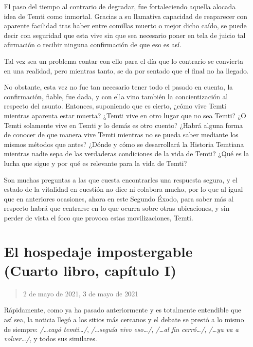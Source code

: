 \documentclass[
  spanish,
]{book}
\begin{document}
El paso del tiempo al contrario de degradar, fue fortaleciendo aquella alocada idea de Temti como inmortal. Gracias a su llamativa capacidad de reaparecer con aparente facilidad tras haber entre comillas muerto o mejor dicho caído, se puede decir con seguridad que esta vive sin que sea necesario poner en tela de juicio tal afirmación o recibir ninguna confirmación de que eso es así.

Tal vez sea un problema contar con ello para el día que lo contrario se convierta en una realidad, pero mientras tanto, se da por sentado que el final no ha llegado.

No obstante, esta vez no fue tan necesario tener todo el pasado en cuenta, la confirmación, fiable, fue dada, y con ella vino también la concientización al respecto del asunto. Entonces, suponiendo que es cierto, ¿cómo vive Temti mientras aparenta estar muerta? ¿Temti vive en otro lugar que no sea Temti? ¿O Temti solamente vive en Temti y lo demás es otro cuento? ¿Habrá alguna forma de conocer de que manera vive Temti mientras no se pueda saber mediante los mismos métodos que antes? ¿Dónde y cómo se desarrollará la Historia Temtiana mientras nadie sepa de las verdaderas condiciones de la vida de Temti? ¿Qué es la lucha que sigue y por qué es relevante para la vida de Temti?

Son muchas preguntas a las que cuesta encontrarles una respuesta segura, y el estado de la vitalidad en cuestión no dice ni colabora mucho, por lo que al igual que en anteriores ocasiones, ahora en este Segundo Éxodo, para saber más al respecto habrá que centrarse en lo que ocurra sobre otras ubicaciones, y sin perder de vista el foco que provoca estas movilizaciones, Temti.

\hypertarget{el-hospedaje-impostergable-cuarto-libro-capuxedtulo-i}{%
\section{El hospedaje impostergable (Cuarto libro, capítulo I)}\label{el-hospedaje-impostergable-cuarto-libro-capuxedtulo-i}}

\begin{quote}
2 de mayo de 2021, 3 de mayo de 2021
\end{quote}

Rápidamente, como ya ha pasado anteriormente y es totalmente entendible que así sea, la noticia llegó a los sitios más cercanos y el debate se prestó a lo mismo de siempre: \emph{/\ldots cayó temti\ldots/}, \emph{/\ldots seguía vivo eso\ldots/}, \emph{/\ldots al fin cerró\ldots/}, \emph{/\ldots ya va a volver\ldots/}, y todos sus similares.
\end{document}
